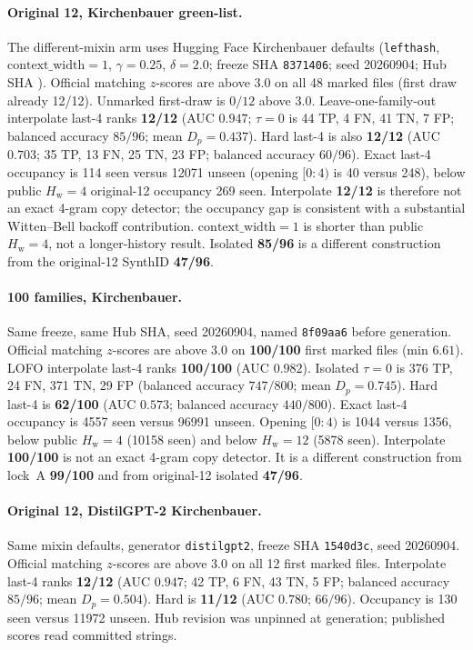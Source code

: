 \documentclass[11pt,a4paper]{article}
\newcommand{\ttsha}[1]{\texttt{\seqsplit{#1}}}
\theoremstyle{definition}
\newcommand{\Hw}{H_{\mathrm{w}}}
\begin{document}
\paragraph{Original 12, Kirchenbauer green-list.}
The different-mixin arm uses Hugging Face Kirchenbauer defaults
(\texttt{lefthash}, $\mathrm{context\_width}=1$, $\gamma=0.25$,
$\delta=2.0$; freeze SHA \texttt{8371406}; seed 20260904; Hub SHA
\ttsha{607a30d783dfa663caf39e06633721c8d4cfcd7e}). Official matching
$z$-scores are above $3.0$ on all 48 marked files (first draw already
12/12). Unmarked first-draw is $0/12$ above $3.0$. Leave-one-family-out
interpolate last-4 ranks \textbf{12/12} (AUC $0.947$; $\tau=0$ is 44 TP,
4 FN, 41 TN, 7 FP; balanced accuracy $85/96$; mean $D_p=0.437$). Hard
last-4 is also \textbf{12/12} (AUC $0.703$; 35 TP, 13 FN, 25 TN, 23 FP;
balanced accuracy $60/96$). Exact last-4 occupancy is 114 seen versus
12071 unseen (opening $[0{:}4)$ is 40 versus 248), below public
$\Hw=4$ original-12 occupancy 269 seen. Interpolate \textbf{12/12} is
therefore not an exact 4-gram copy detector; the occupancy gap is
consistent with a substantial Witten--Bell backoff contribution.
$\mathrm{context\_width}=1$ is shorter than public
$\Hw=4$, not a longer-history result. Isolated \textbf{85/96} is a
different construction from the original-12 SynthID \textbf{47/96}.

\paragraph{100 families, Kirchenbauer.}
Same freeze, same Hub SHA, seed 20260904, named \texttt{8f09aa6}
before generation. Official matching $z$-scores are above $3.0$ on
\textbf{100/100} first marked files (min $6.61$).
LOFO interpolate last-4 ranks \textbf{100/100} (AUC $0.982$).
Isolated $\tau=0$ is 376 TP, 24 FN, 371 TN, 29 FP (balanced accuracy
$747/800$; mean $D_p=0.745$). Hard last-4 is \textbf{62/100}
(AUC $0.573$; balanced accuracy $440/800$).
Exact last-4 occupancy is 4557 seen versus 96991 unseen.
Opening $[0{:}4)$ is 1044 versus 1356, below public $\Hw=4$
(10158 seen) and below $\Hw=12$ (5878 seen). Interpolate
\textbf{100/100} is not an exact 4-gram copy detector.
It is a different construction from lock~A \textbf{99/100}
and from original-12 isolated \textbf{47/96}.

\paragraph{Original 12, DistilGPT-2 Kirchenbauer.}
Same mixin defaults, generator \texttt{distilgpt2}, freeze SHA
\texttt{1540d3c}, seed 20260904. Official matching $z$-scores are above
$3.0$ on all 12 first marked files. Interpolate last-4 ranks
\textbf{12/12} (AUC $0.947$; 42 TP, 6 FN, 43 TN, 5 FP; balanced
accuracy $85/96$; mean $D_p=0.504$). Hard is \textbf{11/12} (AUC
$0.780$; $66/96$). Occupancy is 130 seen versus 11972 unseen. Hub
revision was unpinned at generation; published scores read committed
strings.
\end{document}
